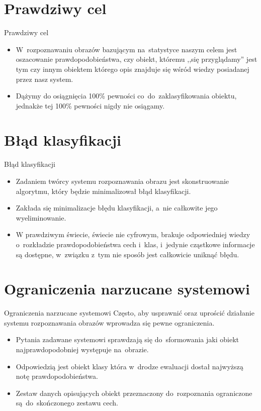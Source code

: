 \documentclass{beamer}
\begin{document}
\section{Prawdziwy cel}
\begin{frame}{Prawdziwy cel}
\begin{itemize}
\item W~rozpoznawaniu obrazów bazującym na~statystyce naszym celem jest oszacowanie prawdopodobieństwa, czy obiekt, któremu ,,się przyglądamy'' jest tym czy innym obiektem którego opis znajduje się wśród wiedzy posiadanej przez nasz system. 
\pause
\item Dążymy do osiągnięcia 100\% pewności co~do~zaklasyfikowania obiektu, jednakże tej 100\% pewności nigdy nie osiągamy.
\end{itemize}
\end{frame}


\section{Błąd klasyfikacji}
\begin{frame}{Błąd klasyfikacji}
\begin{itemize}
\item Zadaniem twórcy systemu rozpoznawania obrazu jest skonstruowanie algorytmu, który będzie minimalizował błąd klasyfikacji.
\pause
\item Zakłada się minimalizacje błędu klasyfikacji, a~nie całkowite jego wyeliminowanie.
\pause
\item W prawdziwym świecie, świecie nie cyfrowym, brakuje odpowiedniej wiedzy o~rozkładzie prawdopodobieństwa cech i~klas, i~jedynie cząstkowe informacje są dostępne, w~związku z~tym nie sposób jest całkowicie uniknąć błędu.
\end{itemize}
\end{frame}


\section{Ograniczenia narzucane systemowi}
\begin{frame}{Ograniczenia narzucane systemowi}
Często, aby usprawnić oraz uprościć działanie systemu rozpoznawania obrazów wprowadza się pewne ograniczenia.
\pause
\begin{itemize}
\item Pytania zadawane systemowi sprawdzają się do~sformowania jaki obiekt najprawdopodobniej występuje na~obrazie.
\pause
\item Odpowiedzią jest obiekt klasy która w~drodze ewaluacji dostał najwyższą notę prawdopodobieństwa.
\pause
\item Zestaw danych opisujących obiekt przeznaczony do~rozpoznania ograniczone są~do~skończonego zestawu cech.
\end{itemize}
\end{frame}
\end{document}

